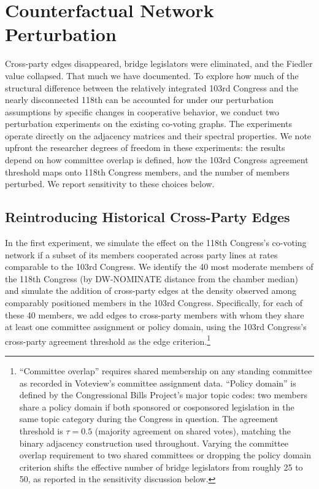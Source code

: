 \documentclass[12pt, a4paper]{article}
\begin{document}
\FloatBarrier
\section{Counterfactual Network Perturbation}\label{sec:counterfactual}

Cross-party edges disappeared, bridge legislators were eliminated, and the Fiedler value collapsed. That much we have documented. To explore how much of the structural difference between the relatively integrated 103rd Congress and the nearly disconnected 118th can be accounted for under our perturbation assumptions by specific changes in cooperative behavior, we conduct two perturbation experiments on the existing co-voting graphs. The experiments operate directly on the adjacency matrices and their spectral properties. We note upfront the researcher degrees of freedom in these experiments: the results depend on how committee overlap is defined, how the 103rd Congress agreement threshold maps onto 118th Congress members, and the number of members perturbed. We report sensitivity to these choices below.

\subsection{Reintroducing Historical Cross-Party Edges}

In the first experiment, we simulate the effect on the 118th Congress's co-voting network if a subset of its members cooperated across party lines at rates comparable to the 103rd Congress. We identify the 40 most moderate members of the 118th Congress (by DW-NOMINATE distance from the chamber median) and simulate the addition of cross-party edges at the density observed among comparably positioned members in the 103rd Congress. Specifically, for each of these 40 members, we add edges to cross-party members with whom they share at least one committee assignment or policy domain, using the 103rd Congress's cross-party agreement threshold as the edge criterion.\footnote{``Committee overlap'' requires shared membership on any standing committee as recorded in Voteview's committee assignment data. ``Policy domain'' is defined by the Congressional Bills Project's major topic codes: two members share a policy domain if both sponsored or cosponsored legislation in the same topic category during the Congress in question. The agreement threshold is $\tau = 0.5$ (majority agreement on shared votes), matching the binary adjacency construction used throughout. Varying the committee overlap requirement to two shared committees or dropping the policy domain criterion shifts the effective number of bridge legislators from roughly 25 to 50, as reported in the sensitivity discussion below.}
\end{document}
